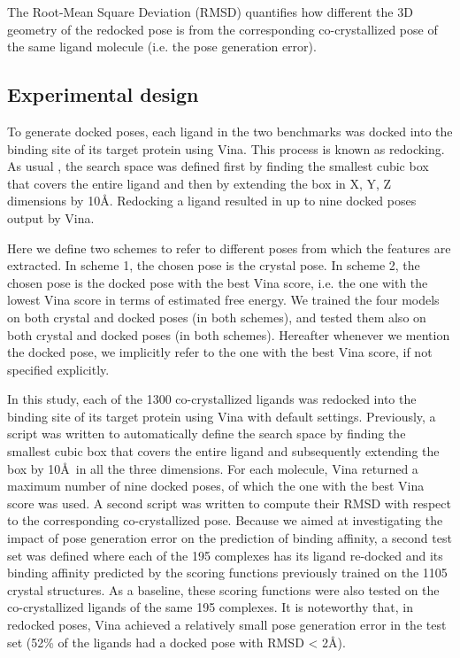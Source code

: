 \documentclass[twocolumn]{bmcart}
\begin{document}
The Root-Mean Square Deviation (RMSD) quantifies how different the 3D geometry of the redocked pose is from the corresponding co-crystallized pose of the same ligand molecule (i.e. the pose generation error).


\subsection*{Experimental design}

To generate docked poses, each ligand in the two benchmarks was docked into the binding site of its target protein using Vina. This process is known as redocking. As usual \cite{1362}, the search space was defined first by finding the smallest cubic box that covers the entire ligand and then by extending the box in X, Y, Z dimensions by 10\AA. Redocking a ligand resulted in up to nine docked poses output by Vina.

Here we define two schemes to refer to different poses from which the features are extracted. In scheme 1, the chosen pose is the crystal pose. In scheme 2, the chosen pose is the docked pose with the best Vina score, i.e. the one with the lowest Vina score in terms of estimated free energy. We trained the four models on both crystal and docked poses (in both schemes), and tested them also on both crystal and docked poses (in both schemes). Hereafter whenever we mention the docked pose, we implicitly refer to the one with the best Vina score, if not specified explicitly.

In this study, each of the 1300 co-crystallized ligands was redocked into the binding site of its target protein using Vina with default settings. Previously, a script was written to automatically define the search space by finding the smallest cubic box that covers the entire ligand and subsequently extending the box by 10\AA\ in all the three dimensions. For each molecule, Vina returned a maximum number of nine docked poses, of which the one with the best Vina score was used. A second script was written to compute their RMSD with respect to the corresponding co-crystallized pose. Because we aimed at investigating the impact of pose generation error on the prediction of binding affinity, a second test set was defined where each of the 195 complexes has its ligand re-docked and its binding affinity predicted by the scoring functions previously trained on the 1105 crystal structures. As a baseline, these scoring functions were also tested on the co-crystallized ligands of the same 195 complexes. It is noteworthy that, in redocked poses, Vina achieved a relatively small pose generation error in the test set (52\% of the ligands had a docked pose with RMSD < 2\AA). %
\end{document}
